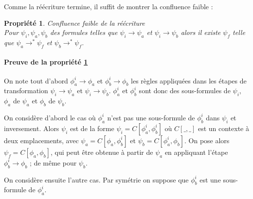 \documentclass[12pt]{article}
\newcommand{\lra}{\ensuremath{\longrightarrow}}
\newtheorem{prop}{Propriété}
\begin{document}
Comme la réécriture termine, il suffit de montrer la confluence faible :

\begin{prop} \emph{Confluence faible de la réécriture} \\
  \label{confl_faible}
  Pour \( \psi_i, \psi_a, \psi_b \) des formules telles que \( \psi_i \longrightarrow \psi_a \) et \( \psi_i \longrightarrow \psi_b \) alors il existe \( \psi_f \) telle que \( \psi_a \longrightarrow^* \psi_f \) et \( \psi_b \longrightarrow^* \psi_f \).
\end{prop}


\paragraph{Preuve de la propriété \ref{confl_faible}}
On note tout d'abord \(\phi_a^i \longrightarrow \phi_a\) et \(\phi_b^i \longrightarrow \phi_b\) les règles appliquées dans les étapes de transformation \(\psi_i \lra \psi_a\) et \(\psi_i \lra \psi_b\).
\(\phi_a^i\) et \(\phi_b^i\) sont donc des sous-formules de \(\psi_i\), \(\phi_a\) de \(\psi_a\) et \(\phi_b\) de \(\psi_b\).
\begin{comment}
On pose tout d'abord les notations :
\[ \psi_i = C_a[\phi_a^i] \longrightarrow C_a[\phi_a] = \psi_a \]
\[ \psi_i = C_b[\phi_b^i] \longrightarrow C_b[\phi_b] = \psi_b \]
où les règles appliquées sont \( \phi_a^i \longrightarrow \phi_a \) et \( \phi_b^i \longrightarrow \phi_b \).
\end{comment}


\smallskip
On considère d'abord le cas où \( \phi_a^i \) n'est pas une sous-formule de \( \phi_b^i \) dans  \(\psi_i\) et inversement.
Alors \( \psi_i\) est de la forme \(\psi_i = C[\phi_a^i, \phi_b^i]\) où \(C[\_,\_]\) est un contexte à deux emplacements, avec \(\psi_a = C[\phi_a, \phi_b^i]\) et \(\psi_b = C[\phi_a^i, \phi_b]\).
On pose alors \(\psi_f = C[\phi_a, \phi_b]\), qui peut être obtenue à partir de \(\psi_a\) en appliquant l'étape \(\phi_b^i \longrightarrow \phi_b \) ; de même pour \(\psi_b\).


\smallskip
On considère ensuite l'autre cas. Par symétrie on suppose que \(\phi_b^i\) est une sous-formule de \(\phi_a^i\).
\end{document}
